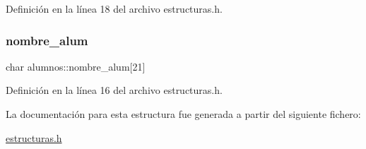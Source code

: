 Definición en la línea 18 del archivo estructuras.\+h.

\mbox{\label{structalumnos_a99ddf967c6149106fcdd8d74064dec00}} 
\subsubsection{\texorpdfstring{nombre\+\_\+alum}{nombre\_alum}}
{\footnotesize\ttfamily char alumnos\+::nombre\+\_\+alum\mbox{[}21\mbox{]}}



Definición en la línea 16 del archivo estructuras.\+h.



La documentación para esta estructura fue generada a partir del siguiente fichero\+:\begin{DoxyCompactItemize}
\item 
\mbox{\hyperlink{estructuras_8h}{estructuras.\+h}}\end{DoxyCompactItemize}
